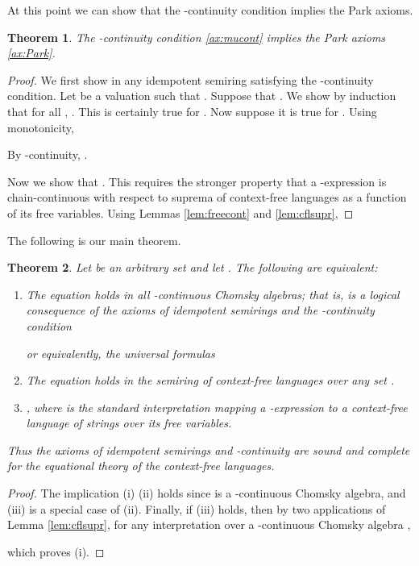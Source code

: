 \documentclass[copyright,creativecommons]{eptcs}
\newtheorem{theorem}{Theorem}[section]
\theoremstyle{remark}
\newcommand{\fhcomment}[1]{\textcolor{red}{[\textbf{Comment (FH)}: {#1}]}}
\newcommand{\dkcomment}[1]{\textcolor{blue}{[\textbf{Comment (DK)}: {#1}]}}
\renewcommand{\fhcomment}[1]{}
\renewcommand{\dkcomment}[1]{}
\begin{document}
At this point we can show that the -continuity condition implies the Park axioms.
\begin{theorem}
The -continuity condition \eqref{ax:mucont} implies the Park axioms \eqref{ax:Park}.
\end{theorem}
\begin{proof}
We first show  in any idempotent semiring satisfying the -continuity condition. Let  be a valuation such that . Suppose that . We show by induction that for all , . This is certainly true for . Now suppose it is true for . Using monotonicity,

By -continuity, .

Now we show that . This requires the stronger property that a -expression is chain-continuous with respect to suprema of context-free languages as a function of its free variables. Using Lemmas \ref{lem:freecont} and \ref{lem:cflsupr},

\end{proof}

The following is our main theorem.
\begin{theorem}
Let  be an arbitrary set and let . 
\fhcomment{Question: Which ? Arbitrary set?}\dkcomment{Yes.}The following are equivalent:
\begin{enumerate}
\renewcommand\labelenumi{{\upshape(\roman{enumi})}}
\item
The equation  holds in all -continuous Chomsky algebras; that is,  is a logical consequence of the axioms of idempotent semirings and the -continuity condition

or equivalently, the universal formulas

\item
The equation  holds in the semiring of context-free languages  over any set .
\item
, where  is the standard interpretation mapping a -expression to a context-free language of strings over its free variables.
\end{enumerate}
Thus the axioms of idempotent semirings and -continuity are sound and complete for the equational theory of the context-free languages.
\end{theorem}
\begin{proof}
The implication (i)  (ii) holds since  is a -continuous Chomsky algebra, and (iii) is a special case of (ii). Finally, if (iii) holds, then by two applications of Lemma \ref{lem:cflsupr}, for any interpretation  over a -continuous Chomsky algebra ,

which proves (i).
\end{proof}
\end{document}
